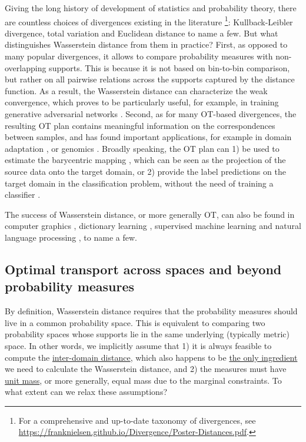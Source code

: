 Giving the long history of development of statistics and probability theory,
there are countless choices of divergences existing in the literature
\footnote{For a comprehensive and up-to-date taxonomy of divergences, see
\url{https://franknielsen.github.io/Divergence/Poster-Distances.pdf}.}:
Kullback-Leibler divergence, total variation and Euclidean distance to name a few.
But what distinguishes Wasserstein distance from them in practice?
First, as opposed to many popular divergences, it allows to compare probability measures with
non-overlapping supports. This is because it is not based on bin-to-bin comparison,
but rather on all pairwise relations across the supports captured by the distance function.
As a result, the Wasserstein distance can characterize the weak convergence,
which proves to be particularly useful, for example, in training generative adversarial networks \citep{Arjovsky17}.
Second, as for many OT-based divergences, the resulting OT plan contains
meaningful information on the correspondences between samples, and has found important applications,
for example in domain adaptation \citep{Courty16}, or genomics \citep{Schiebinger19}.
Broadly speaking, the OT plan can 1) be used to estimate the barycentric mapping
\citep{Ferradans14,Courty16}, which can be seen as the projection of the source data
onto the target domain, or 2) provide the label predictions on the target domain
in the classification problem, without the need of training a classifier \citep{Redko19a}.

The success of Wasserstein distance, or more generally OT, can also be found in
computer graphics \citep{Bonneel16,Solomon15,Bonneel23}, dictionary learning \citep{Rolet16},
supervised machine learning \citep{Frogner15} and
natural language processing \citep{Kusner15}, to name a few.

\subsection{Optimal transport across spaces and beyond probability measures}

By definition, Wasserstein distance requires that the probability measures
should live in a common probability space. This is equivalent to comparing two
probability spaces whose supports lie in the same underlying (typically metric) space.
In other words, we implicitly assume that 1) it is always feasible to compute
the \underline{inter-domain distance}, which also happens to be \underline{the only ingredient}
we need to calculate the Wasserstein distance, and 2) the measures must have \underline{unit mass},
or more generally, equal mass due to the marginal constraints.
To what extent can we relax these assumptions?

